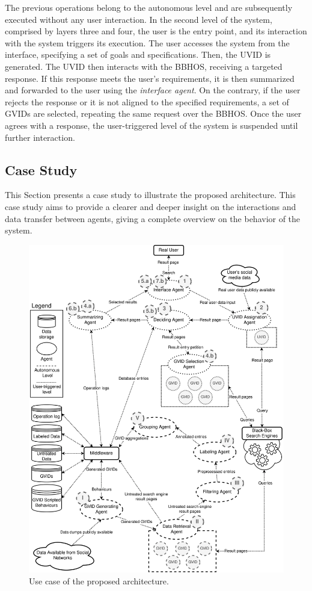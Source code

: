 The previous operations belong to the autonomous level and are subsequently executed without any user interaction. In the second level of the system, comprised by layers three and four, the user is the entry point, and its interaction with the system triggers its execution. The user accesses the system from the interface, specifying a set of goals and specifications. Then, the UVID is generated. The UVID then interacts with the BBHOS, receiving a targeted response. If this response meets the user's requirements, it is then summarized and forwarded to the user using the \textit{interface agent}. On the contrary, if the user rejects the response or it is not aligned to the specified requirements, a set of GVIDs are selected, repeating the same request over the BBHOS. Once the user agrees with a response, the user-triggered level of the system is suspended until further interaction.

\subsection{Case Study}\label{6_sec:subsec:case_study}


This Section presents a case study to illustrate the proposed architecture. This case study aims to provide a clearer and deeper insight on the interactions and data transfer between agents, giving a complete overview on the behavior of the system. 

\begin{figure}[t!]
    \centering
    \includegraphics[width=.9\linewidth]{6_kbsextractiondl/figures/Use_Case.eps}
    \caption{Use case of the proposed architecture.}
    \label{fig:mas_use_case}
\end{figure}


